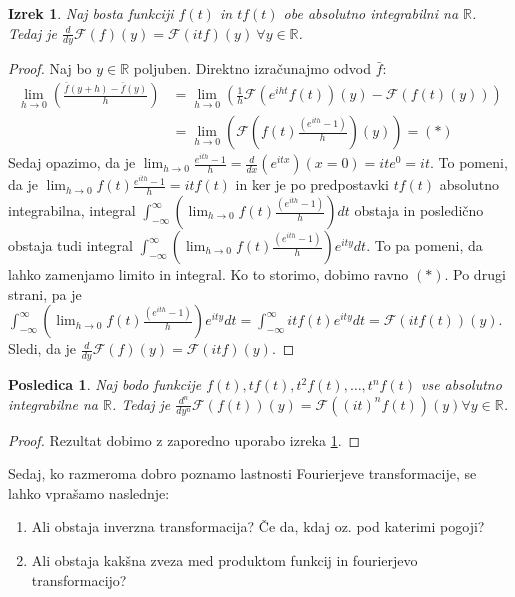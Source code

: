 \documentclass[a4paper, 10pt]{article}
\newtheorem{izr}{Izrek}
\newtheorem{posl}{Posledica}[izr]
\newcommand{\mth}[1]{\ensuremath{\mathbb{#1}}}
\newcommand{\R}{\mth{R}}
\begin{document}
			\begin{izr}
				\label{izr:odvFourierT}
				Naj bosta funkciji $f(t)$ in $tf(t)$ obe absolutno integrabilni na $\R$. Tedaj je $\frac{d}{dy}\mathcal{F}(f)(y) = \mathcal{F}(itf)(y)~\forall y\in\R$.
			\end{izr}
			\begin{proof}
				Naj bo $y\in \R$ poljuben. Direktno izračunajmo odvod $\bar{f}$: \begin{align*}
				\lim_{h\to0}(\frac{\bar{f}(y+h) - \bar{f}(y)}{h}) &= \lim_{h\to 0}(\frac{1}{h}\mathcal{F}(e^{iht}f(t))(y) - \mathcal{F}(f(t)(y))) \\
				&= \lim_{h\to 0}(\mathcal{F}(f(t)\frac{(e^{ith}-1)}{h})(y)) = (*)
				\end{align*}
				Sedaj opazimo, da je $\lim_{h\to 0}\frac{e^{ith}-1}{h} = \frac{d}{dx}(e^{itx})(x=0) = ite^{0} = it$. To pomeni, da je $\lim_{h\to 0}f(t)\frac{e^{ith}-1}{h} = itf(t)$ in ker je po predpostavki $tf(t)$ absolutno integrabilna, integral $\int_{-\infty}^\infty (\lim_{h\to 0}f(t)\frac{(e^{ith}-1)}{h})dt$ obstaja in posledično obstaja tudi integral $\int_{-\infty}^\infty (\lim_{h\to 0}f(t)\frac{(e^{ith}-1)}{h})e^{ity}dt$. To pa pomeni, da lahko zamenjamo limito in integral. Ko to storimo, dobimo ravno $(*)$. Po drugi strani, pa je $\int_{-\infty}^\infty (\lim_{h\to 0}f(t)\frac{(e^{ith}-1)}{h})e^{ity}dt=\int_{-\infty}^\infty itf(t)e^{ity}dt = \mathcal{F}(itf(t))(y)$. Sledi, da je $\frac{d}{dy}\mathcal{F}(f)(y) = \mathcal{F}(itf)(y)$.
			\end{proof}
			
			\begin{posl}
				\label{posl:nodvFT}
				Naj bodo funkcije $f(t), tf(t), t^2f(t), \ldots, t^nf(t)$ vse absolutno integrabilne na $\R$. Tedaj je $\frac{d^n}{dy^n}\mathcal{F}(f(t))(y) = \mathcal{F}((it)^nf(t))(y) \forall y\in \R$.
			\end{posl}
			\begin{proof}
				Rezultat dobimo z zaporedno uporabo izreka \ref{izr:odvFourierT}.
			\end{proof}
			
			Sedaj, ko razmeroma dobro poznamo lastnosti Fourierjeve transformacije, se lahko vprašamo naslednje: \begin{enumerate}
				\item Ali obstaja inverzna transformacija? Če da, kdaj oz. pod katerimi pogoji?
				\item Ali obstaja kakšna zveza med produktom funkcij in fourierjevo transformacijo?
			\end{enumerate}
			
\end{document}
